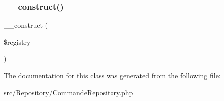 \subsubsection{\texorpdfstring{\+\_\+\+\_\+construct()}{\_\_construct()}}
{\footnotesize\ttfamily \+\_\+\+\_\+construct (\begin{DoxyParamCaption}\item[{Manager\+Registry}]{\$registry }\end{DoxyParamCaption})}



The documentation for this class was generated from the following file\+:\begin{DoxyCompactItemize}
\item 
src/\+Repository/\mbox{\hyperlink{_commande_repository_8php}{Commande\+Repository.\+php}}\end{DoxyCompactItemize}
